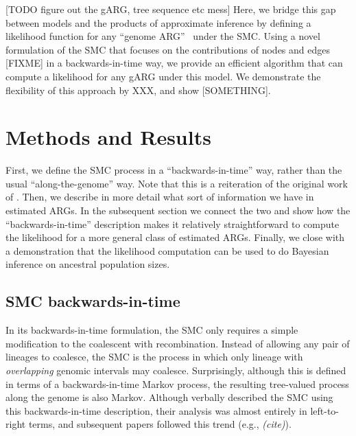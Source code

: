 \documentclass{article}
\newcommand{\comment}[1]{{\it \color{orange} (#1)}}
\begin{document}
[TODO figure out the gARG, tree sequence etc mess]
Here, we bridge this gap between models and the products of approximate
inference by defining a likelihood function for any 
``genome ARG''~\citep{wong_general_2023} under the SMC. Using a novel
formulation of the SMC that focuses on the contributions of nodes and 
edges [FIXME] in a backwards-in-time way, we provide an efficient 
algorithm that can compute a likelihood for any gARG under this model.
We demonstrate the flexibility of this approach by XXX, and show
[SOMETHING]. 


\section{Methods and Results}

First, we define the SMC process in a ``backwards-in-time'' way,
rather than the usual ``along-the-genome'' way.
Note that this is a
reiteration of the original work of \citet{mcvean_approximating_2005}.
Then, we describe
in more detail what sort of information we have in estimated ARGs.
In the subsequent section we connect the two and
show how the ``backwards-in-time'' description
makes it relatively straightforward to compute the likelihood
for a more general class of estimated ARGs.
Finally, we close with a demonstration that the likelihood computation can be used
to do Bayesian inference on ancestral population sizes.

\subsection{SMC backwards-in-time}\label{par:description}

In its backwards-in-time formulation, the SMC \citep{mcvean_approximating_2005} only requires a
simple modification to the coalescent with recombination.
Instead of allowing any pair of lineages to coalesce,
the SMC is the process in which only lineage with \emph{overlapping} genomic intervals may coalesce.
Surprisingly, although this is defined in terms of a backwards-in-time Markov process,
the resulting tree-valued process along the genome is also Markov.
Although \citet{mcvean_approximating_2005} verbally described the SMC 
using this backwards-in-time description, their analysis
was almost entirely in left-to-right terms,
and subsequent papers followed this trend
(e.g., \comment{cite}).
\end{document}
